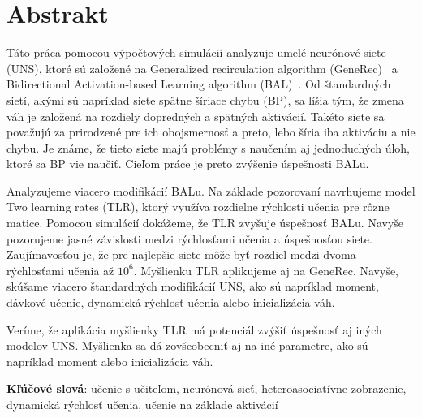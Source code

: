 
\section*{Abstrakt}
Táto práca pomocou výpočtových simulácií analyzuje umelé neurónové siete (UNS), ktoré sú založené na Generalized recirculation algorithm (GeneRec)~\citep{o1996bio} a Bidirectional Activation-based Learning algorithm (BAL)~\citep{farkas2013bal}. Od štandardných sietí, akými sú napríklad siete spätne šíriace chybu (BP), sa líšia tým, že zmena váh je založená na rozdiely dopredných a spätných aktivácií. Takéto siete sa považujú za prirodzené pre ich obojsmernosť a preto, lebo šíria iba aktiváciu a nie chybu. Je známe, že tieto siete majú problémy s naučením aj jednoduchých úloh, ktoré sa BP vie naučiť. Cieľom práce je preto zvýšenie úspešnosti BALu. 

Analyzujeme viacero modifikácií BALu. Na základe pozorovaní navrhujeme model Two learning rates (TLR), ktorý využíva rozdielne rýchlosti učenia pre rôzne matice. Pomocou simulácií dokážeme, že TLR zvyšuje úspešnosť BALu. Navyše pozorujeme jasné závislosti medzi rýchlosťami učenia a úspešnosťou siete. Zaujímavosťou je, že pre najlepšie siete môže byť rozdiel medzi dvoma rýchlosťami učenia až $10^6$. Myšlienku TLR aplikujeme aj na GeneRec. Navyše, skúšame viacero štandardných modifikácií UNS, ako sú napríklad moment, dávkové učenie, dynamická rýchlosť učenia alebo inicializácia váh. 

Veríme, že aplikácia myšlienky TLR má potenciál zvýšiť úspešnosť aj iných modelov UNS. Myšlienka sa dá zovšeobecniť aj na iné parametre, ako sú napríklad moment alebo inicializácia váh. 

\begin{flushleft}
  {\bf Kľúčové slová}: učenie s učiteľom, neurónová sieť, heteroasociatívne zobrazenie, dynamická rýchlosť učenia, učenie na základe aktivácií
\end{flushleft}

